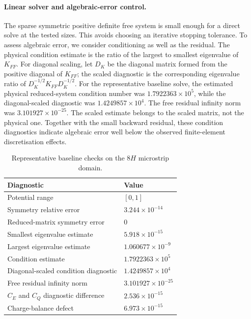 \documentclass[11pt]{article}
\begin{document}
\paragraph{Linear solver and algebraic-error control.}
The sparse symmetric positive definite free system is small enough for a direct solve at the tested sizes. This avoids choosing an iterative stopping tolerance. To assess algebraic error, we consider conditioning as well as the residual. The physical condition estimate is the ratio of the largest to smallest eigenvalue of $K_{FF}$. For diagonal scaling, let $D_K$ be the diagonal matrix formed from the positive diagonal of $K_{FF}$; the scaled diagnostic is the corresponding eigenvalue ratio of $D_K^{-1/2}K_{FF}D_K^{-1/2}$. For the representative baseline solve, the estimated physical reduced-system condition number was $1.7922363\times10^5$, while the diagonal-scaled diagnostic was $1.4249857\times10^4$. The free residual infinity norm was $3.101927\times10^{-25}$. The scaled estimate belongs to the scaled matrix, not the physical one. Together with the small backward residual, these condition diagnostics indicate algebraic error well below the observed finite-element discretisation effects.

\begin{table}[H]
\centering
\small
\caption{Representative baseline checks on the $8H$ microstrip domain.}
\label{tab:baseline}
\begin{tabular}{@{}ll@{}}
\toprule
Diagnostic & Value\\
\midrule
Potential range & $[0,1]$\\
Symmetry relative error & $3.244\times10^{-14}$\\
Reduced-matrix symmetry error & $0$\\
Smallest eigenvalue estimate & $5.918\times10^{-15}$\\
Largest eigenvalue estimate & $1.060677\times10^{-9}$\\
Condition estimate & $1.7922363\times10^5$\\
Diagonal-scaled condition diagnostic & $1.4249857\times10^4$\\
Free residual infinity norm & $3.101927\times10^{-25}$\\
$C_E$ and $C_Q$ diagnostic difference & $2.536\times10^{-15}$\\
Charge-balance defect & $6.973\times10^{-15}$\\
\bottomrule
\end{tabular}
\end{table}
\end{document}
